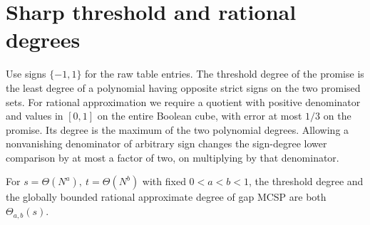 \section{Sharp threshold and rational degrees}
Use signs \(\{-1,1\}\) for the raw table entries. The threshold degree of the promise is the least degree of a polynomial having opposite strict signs on the two promised sets. For rational approximation we require a quotient with positive denominator and values in \([0,1]\) on the entire Boolean cube, with error at most \(1/3\) on the promise. Its degree is the maximum of the two polynomial degrees. Allowing a nonvanishing denominator of arbitrary sign changes the sign-degree lower comparison by at most a factor of two, on multiplying by that denominator.

\begin{theorem}
For \(s=\Theta(N^a),\ t=\Theta(N^b)\) with fixed \(0<a<b<1\), the threshold degree and the globally bounded rational approximate degree of gap MCSP are both \(\Theta_{a,b}(s)\).
\end{theorem}
